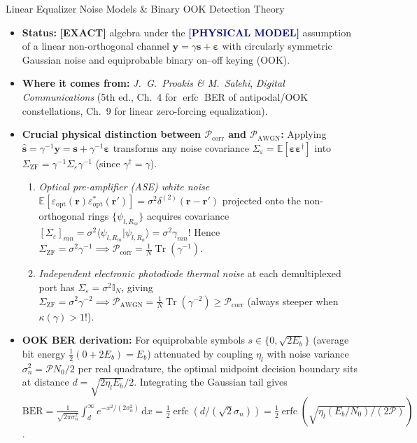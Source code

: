 \documentclass[10pt,letterpaper]{article}
\newcommand{\braket}[2]{\langle #1 | #2 \rangle}
\newcommand{\dd}{\mathrm{d}}
\newcommand{\tagexact}{\textcolor{forest}{\textbf{[EXACT]}}}
\newcommand{\tagmodel}{\textcolor{navy}{\textbf{[PHYSICAL MODEL]}}}
\numberwithin{equation}{section}
\begin{document}
\begin{approxbox}{Linear Equalizer Noise Models \& Binary OOK Detection Theory}
\begin{itemize}[leftmargin=1.4em,itemsep=2pt,topsep=1pt]
  \item \textbf{Status:} \tagexact{} algebra under the \tagmodel{} assumption of a linear non-orthogonal channel $\mathbf{y} = \gamma\mathbf{s} + \boldsymbol{\varepsilon}$ with circularly symmetric Gaussian noise and equiprobable binary on--off keying (OOK).
  \item \textbf{Where it comes from:} \emph{J.\ G.\ Proakis \& M.\ Salehi}, \emph{Digital Communications} (5th ed., Ch.~4 for $\operatorname{erfc}$ BER of antipodal/OOK constellations, Ch.~9 for linear zero-forcing equalization).
  \item \textbf{Crucial physical distinction between $\mathcal{P}_{\mathrm{corr}}$ and $\mathcal{P}_{\mathrm{AWGN}}$:}
    Applying $\hat{\mathbf{s}} = \gamma^{-1}\mathbf{y} = \mathbf{s} + \gamma^{-1}\boldsymbol{\varepsilon}$ transforms any noise covariance $\Sigma_\varepsilon = \mathbb{E}[\boldsymbol{\varepsilon}\boldsymbol{\varepsilon}^\dagger]$ into $\Sigma_{\mathrm{ZF}} = \gamma^{-1}\Sigma_\varepsilon\gamma^{-1}$ (since $\gamma^\dagger = \gamma$).
    \begin{enumerate}[leftmargin=1.4em,itemsep=1pt,topsep=1pt]
      \item \emph{Optical pre-amplifier (ASE) white noise} $\mathbb{E}[\varepsilon_{\mathrm{opt}}(\mathbf{r})\varepsilon_{\mathrm{opt}}^*(\mathbf{r}')] = \sigma^2\delta^{(2)}(\mathbf{r}-\mathbf{r}')$ projected onto the non-orthogonal rings $\{\psi_{l,R_m}\}$ acquires covariance $[\Sigma_\varepsilon]_{mn} = \sigma^2\braket{\psi_{l,R_m}}{\psi_{l,R_n}} = \sigma^2\gamma_{mn}$! Hence $\Sigma_{\mathrm{ZF}} = \sigma^2\gamma^{-1} \implies \mathcal{P}_{\mathrm{corr}} = \frac{1}{N}\operatorname{Tr}(\gamma^{-1})$.
      \item \emph{Independent electronic photodiode thermal noise} at each demultiplexed port has $\Sigma_\varepsilon = \sigma^2\mathbb{I}_N$, giving $\Sigma_{\mathrm{ZF}} = \sigma^2\gamma^{-2} \implies \mathcal{P}_{\mathrm{AWGN}} = \frac{1}{N}\operatorname{Tr}(\gamma^{-2}) \ge \mathcal{P}_{\mathrm{corr}}$ (always steeper when $\kappa(\gamma) > 1$!).
    \end{enumerate}
  \item \textbf{OOK BER derivation:} For equiprobable symbols $s \in \{0, \sqrt{2E_b}\}$ (average bit energy $\frac{1}{2}(0 + 2E_b) = E_b$) attenuated by coupling $\eta_l$ with noise variance $\sigma_n^2 = \mathcal{P} N_0/2$ per real quadrature, the optimal midpoint decision boundary sits at distance $d = \sqrt{2\eta_l E_b}/2$. Integrating the Gaussian tail gives $\mathrm{BER} = \frac{1}{\sqrt{2\pi\sigma_n^2}}\int_d^\infty e^{-x^2/(2\sigma_n^2)}\,\dd x = \frac{1}{2}\operatorname{erfc}(d/(\sqrt{2}\sigma_n)) = \frac{1}{2}\operatorname{erfc}(\sqrt{\eta_l(E_b/N_0)/(2\mathcal{P})})$.
\end{itemize}
\end{approxbox}
\end{document}
